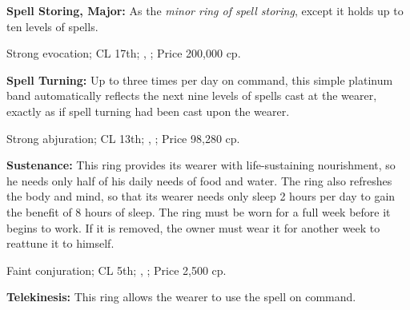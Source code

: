 \textbf{Spell Storing, Major:} As the \emph{minor ring of spell storing}, except it holds up to ten levels of spells.

Strong evocation; CL 17th; , ; Price 200,000 cp.


\textbf{Spell Turning:} Up to three times per day on command, this simple platinum band automatically reflects the next nine levels of spells cast at the wearer, exactly as if spell turning had been cast upon the wearer.

Strong abjuration; CL 13th; , ; Price 98,280 cp.


\textbf{Sustenance:} This ring provides its wearer with life-sustaining nourishment, so he needs only half of his daily needs of food and water. The ring also refreshes the body and mind, so that its wearer needs only sleep 2 hours per day to gain the benefit of 8 hours of sleep. The ring must be worn for a full week before it begins to work. If it is removed, the owner must wear it for another week to reattune it to himself.

Faint conjuration; CL 5th; , ; Price 2,500 cp.











\textbf{Telekinesis:} This ring allows the wearer to use the spell  on command.

